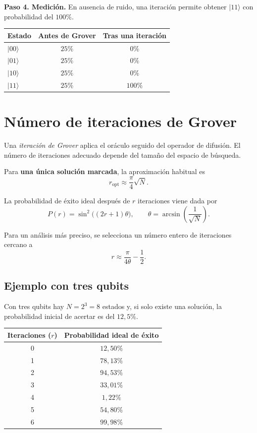 \documentclass[11pt,a4paper]{article}
\begin{document}
\textbf{Paso 4. Medición.} En ausencia de ruido, una iteración permite obtener $\lvert 11\rangle$ con probabilidad del $100\%$.

\begin{center}
\begin{tabular}{@{}lcc@{}}
\toprule
\textbf{Estado} & \textbf{Antes de Grover} & \textbf{Tras una iteración} \\
\midrule
$\lvert 00\rangle$ & $25\%$ & $0\%$ \\
$\lvert 01\rangle$ & $25\%$ & $0\%$ \\
$\lvert 10\rangle$ & $25\%$ & $0\%$ \\
$\lvert 11\rangle$ & $25\%$ & $100\%$ \\
\bottomrule
\end{tabular}
\end{center}

\section{Número de iteraciones de Grover}

Una \emph{iteración de Grover} aplica el oráculo seguido del operador de difusión. El número de iteraciones adecuado depende del tamaño del espacio de búsqueda.

Para \textbf{una única solución marcada}, la aproximación habitual es
\[
\boxed{r_{\mathrm{opt}}\approx\frac{\pi}{4}\sqrt{N}.}
\]

La probabilidad de éxito ideal después de $r$ iteraciones viene dada por
\[
\boxed{P(r)=\sin^2\!\bigl((2r+1)\theta\bigr),\qquad
\theta=\arcsin\!\left(\frac{1}{\sqrt{N}}\right).}
\]

Para un análisis más preciso, se selecciona un número entero de iteraciones cercano a
\[
r\approx \frac{\pi}{4\theta}-\frac12.
\]

\subsection{Ejemplo con tres qubits}

Con tres qubits hay $N=2^3=8$ estados y, si solo existe una solución, la probabilidad inicial de acertar es del $12{,}5\%$.

\begin{center}
\begin{tabular}{@{}cc@{}}
\toprule
\textbf{Iteraciones ($r$)} & \textbf{Probabilidad ideal de éxito} \\
\midrule
0 & $12{,}50\%$ \\
1 & $78{,}13\%$ \\
2 & $94{,}53\%$ \\
3 & $33{,}01\%$ \\
4 & $1{,}22\%$ \\
5 & $54{,}80\%$ \\
6 & $99{,}98\%$ \\
\bottomrule
\end{tabular}
\end{center}
\end{document}
